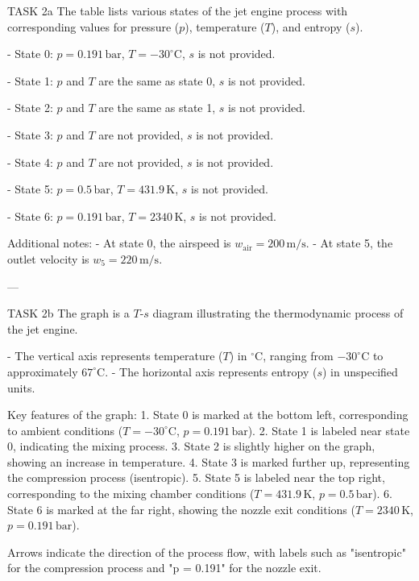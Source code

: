TASK 2a  
The table lists various states of the jet engine process with corresponding values for pressure (\( p \)), temperature (\( T \)), and entropy (\( s \)).  

- State 0:  
  \( p = 0.191 \, \text{bar} \), \( T = -30^\circ\text{C} \), \( s \) is not provided.  

- State 1:  
  \( p \) and \( T \) are the same as state 0, \( s \) is not provided.  

- State 2:  
  \( p \) and \( T \) are the same as state 1, \( s \) is not provided.  

- State 3:  
  \( p \) and \( T \) are not provided, \( s \) is not provided.  

- State 4:  
  \( p \) and \( T \) are not provided, \( s \) is not provided.  

- State 5:  
  \( p = 0.5 \, \text{bar} \), \( T = 431.9 \, \text{K} \), \( s \) is not provided.  

- State 6:  
  \( p = 0.191 \, \text{bar} \), \( T = 2340 \, \text{K} \), \( s \) is not provided.  

Additional notes:  
- At state 0, the airspeed is \( w_{\text{air}} = 200 \, \text{m/s} \).  
- At state 5, the outlet velocity is \( w_5 = 220 \, \text{m/s} \).  

---

TASK 2b  
The graph is a \( T \)-\( s \) diagram illustrating the thermodynamic process of the jet engine.  

- The vertical axis represents temperature (\( T \)) in \( ^\circ\text{C} \), ranging from \( -30^\circ\text{C} \) to approximately \( 67^\circ\text{C} \).  
- The horizontal axis represents entropy (\( s \)) in unspecified units.  

Key features of the graph:  
1. State 0 is marked at the bottom left, corresponding to ambient conditions (\( T = -30^\circ\text{C} \), \( p = 0.191 \, \text{bar} \)).  
2. State 1 is labeled near state 0, indicating the mixing process.  
3. State 2 is slightly higher on the graph, showing an increase in temperature.  
4. State 3 is marked further up, representing the compression process (isentropic).  
5. State 5 is labeled near the top right, corresponding to the mixing chamber conditions (\( T = 431.9 \, \text{K} \), \( p = 0.5 \, \text{bar} \)).  
6. State 6 is marked at the far right, showing the nozzle exit conditions (\( T = 2340 \, \text{K} \), \( p = 0.191 \, \text{bar} \)).  

Arrows indicate the direction of the process flow, with labels such as "isentropic" for the compression process and "p = 0.191" for the nozzle exit.